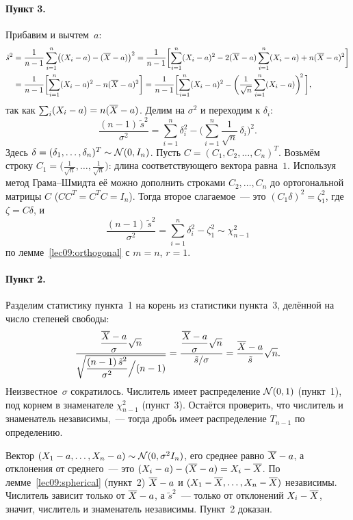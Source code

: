 \paragraph{Пункт 3.}
Прибавим и вычтем~$a$:
\begin{align*}
  \tilde s^2
  &= \frac{1}{n-1} \sum_{i=1}^n \bigl((X_i - a) - (\overline{X} - a)\bigr)^2
   = \frac{1}{n-1} \biggl[\sum_{i=1}^n (X_i - a)^2 - 2(\overline{X} - a)\sum_{i=1}^n (X_i - a) + n(\overline{X} - a)^2\biggr] \\
  &= \frac{1}{n-1} \biggl[\sum_{i=1}^n (X_i - a)^2 - n(\overline{X} - a)^2\biggr]
   = \frac{1}{n-1} \biggl[\sum_{i=1}^n (X_i - a)^2 - \biggl(\frac{1}{\sqrt n} \sum_{i=1}^n (X_i - a)\biggr)^{\!2}\,\biggr],
\end{align*}
так как $\sum_i (X_i - a) = n(\overline{X} - a)$. Делим на $\sigma^2$ и переходим к $\delta_i$:
\[
  \frac{(n-1)\,\tilde s^2}{\sigma^2}
  = \sum_{i=1}^n \delta_i^2 - \biggl(\sum_{i=1}^n \frac{1}{\sqrt n}\, \delta_i\biggr)^{\!2}.
\]
Здесь $\delta = (\delta_1, \ldots, \delta_n)^T \sim \mathcal{N}(0, I_n)$.
Пусть $C=(C_1, C_2, \ldots, C_n)^T$. Возьмём строку
$C_1 = \bigl(\frac{1}{\sqrt n}, \ldots, \frac{1}{\sqrt n}\bigr)$: длина соответствующего вектора
равна~$1$. Используя метод Грама--Шмидта её можно дополнить строками $C_2, \ldots, C_n$ до
ортогональной матрицы $C$ ($C C^T = C^T C = I_n$). Тогда второе слагаемое~---
это $(C_1 \delta)^2 = \zeta_1^2$, где $\zeta = C\delta$, и
\[
  \frac{(n-1)\,\tilde s^2}{\sigma^2} = \sum_{i=1}^n \delta_i^2 - \zeta_1^2 \sim \chi^2_{n-1}
\]
по лемме~\ref{lec09:orthogonal} с $m = n$, $r = 1$.

\paragraph{Пункт 2.}
Разделим статистику пункта~1 на корень из статистики пункта~3, делённой на число степеней
свободы:
\[
  \frac{\dfrac{\overline{X} - a}{\sigma}\sqrt n}{\sqrt{\dfrac{(n-1)\,\tilde s^2}{\sigma^2} \Big/ (n-1)}}
  = \frac{\dfrac{\overline{X} - a}{\sigma}\sqrt n}{\tilde s / \sigma}
  = \frac{\overline{X} - a}{\tilde s}\sqrt n.
\]
Неизвестное~$\sigma$ сократилось. Числитель имеет распределение $\mathcal{N}(0, 1)$ (пункт~1),
под корнем в знаменателе $\chi^2_{n-1}$ (пункт~3). Остаётся проверить, что числитель
и знаменатель независимы,~--- тогда дробь имеет распределение $T_{n-1}$ по определению.

Вектор $(X_1 - a, \ldots, X_n - a) \sim \mathcal{N}(0, \sigma^2 I_n)$, его среднее равно
$\overline{X} - a$, а отклонения от среднего~--- это $(X_i - a) - (\overline{X} - a) = X_i - \overline{X}$.
По лемме~\ref{lec09:spherical} (пункт~2) $\overline{X} - a$ и $(X_1 - \overline{X}, \ldots, X_n - \overline{X})$
независимы. Числитель зависит только от $\overline{X} - a$, а $\tilde s^2$~--- только от отклонений
$X_i - \overline{X}$, значит, числитель и знаменатель независимы. Пункт~2 доказан.

